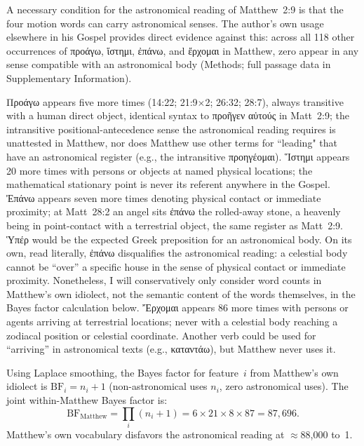 \documentclass[sn-nature]{sn-jnl}
\newcommand{\grk}[1]{{\fontencoding{LGR}\selectfont #1}}
\newcommand{\grk}[1]{{\greekfont #1}}
\begin{document}
A necessary condition for the astronomical reading of Matthew~2:9 is that the
four motion words can carry astronomical senses. The author's own usage
elsewhere in his Gospel provides direct evidence against this: across all 118
other occurrences of \grk{προάγω}, \grk{ἵστημι}, \grk{ἐπάνω}, and
\grk{ἔρχομαι} in Matthew, zero appear in any sense compatible with an
astronomical body (Methods; full passage data in Supplementary Information).

\grk{Προάγω} appears five more times (14:22; 21:9$\times$2; 26:32; 28:7),
always transitive with a human direct object, identical syntax to
\grk{προῆγεν αὐτούς} in Matt~2:9; the intransitive positional-antecedence
sense the astronomical reading requires is unattested in Matthew, nor does 
Matthew use other terms for ``leading" that have an astronomical register 
(e.g., the intransitive \grk{προηγέομαι}).
\grk{Ἵστημι} appears 20 more times with persons or objects at named physical
locations; the mathematical stationary point is never its referent anywhere in
the Gospel.
\grk{Ἐπάνω} appears seven more times denoting physical contact or immediate
proximity; at Matt~28:2 an angel sits \grk{ἐπάνω} the rolled-away stone, a
heavenly being in point-contact with a terrestrial object, the same register
as Matt~2:9. \grk{Ὑπέρ} would be the expected Greek preposition for an astronomical body. 
On its own, read literally, \grk{ἐπάνω} disqualifies the astronomical 
reading: a celestial body cannot be ``over'' a specific house in the sense of physical 
contact or immediate proximity. Nonetheless, I will conservatively only consider word 
counts in Matthew's own idiolect, not the semantic content of the words themselves, 
in the Bayes factor calculation below.
\grk{Ἔρχομαι} appears 86 more times with persons or agents
arriving at terrestrial locations; never with a celestial body reaching a
zodiacal position or celestial coordinate. Another verb could be used for ``arriving'' 
in astronomical texts (e.g., \grk{καταντάω}), but Matthew never uses it.

Using Laplace smoothing, the Bayes factor for feature~$i$ from Matthew's own
idiolect is $\mathrm{BF}_i = n_i + 1$ (non-astronomical uses $n_i$, zero
astronomical uses). The joint within-Matthew Bayes factor is:
\begin{equation}
  \mathrm{BF}_\text{Matthew}
    = \prod_i (n_i + 1)
    = 6 \times 21 \times 8 \times 87
    = 87{,}696.
  \label{eq:bf_matthew_main}
\end{equation}
Matthew's own vocabulary disfavors the astronomical reading at $\approx$88{,}000 to~1.
\end{document}
